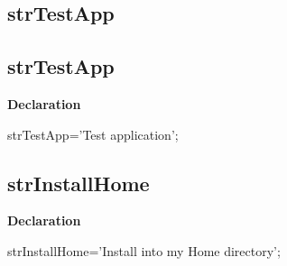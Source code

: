 \documentclass{report}
\newif\ifpdf
\begin{document}
\subsection*{\large{\textbf{strTestApp}}\normalsize\hspace{1ex}\hrulefill}
\else
\subsection*{strTestApp}
\fi
\label{trstrings-strTestApp}
\begin{list}{}{
\setlength{\itemindent}{0cm}
\setlength{\listparindent}{0cm}
\setlength{\leftmargin}{\evensidemargin}
\addtolength{\leftmargin}{\tmplength}
\settowidth{\labelsep}{X}
\addtolength{\leftmargin}{\labelsep}
\setlength{\labelwidth}{\tmplength}
}
\item[\textbf{Declaration}\hfill]
\ifpdf
\begin{flushleft}
\fi
\begin{ttfamily}
strTestApp='Test application';\end{ttfamily}

\ifpdf
\end{flushleft}
\fi

\end{list}
\ifpdf
\subsection*{\large{\textbf{strInstallHome}}\normalsize\hspace{1ex}\hrulefill}
\else
\subsection*{strInstallHome}
\fi
\label{trstrings-strInstallHome}
\begin{list}{}{
\setlength{\itemindent}{0cm}
\setlength{\listparindent}{0cm}
\setlength{\leftmargin}{\evensidemargin}
\addtolength{\leftmargin}{\tmplength}
\settowidth{\labelsep}{X}
\addtolength{\leftmargin}{\labelsep}
\setlength{\labelwidth}{\tmplength}
}
\item[\textbf{Declaration}\hfill]
\ifpdf
\begin{flushleft}
\fi
\begin{ttfamily}
strInstallHome='Install into my Home directory';\end{ttfamily}

\ifpdf
\end{flushleft}
\fi

\end{list}
\ifpdf
\end{document}
